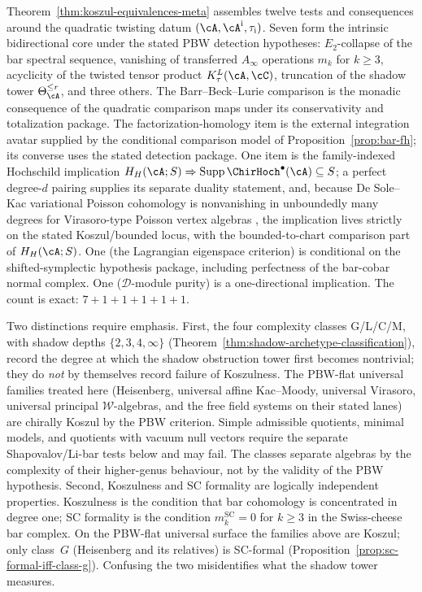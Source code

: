 Theorem~\ref{thm:koszul-equivalences-meta} assembles twelve
tests and consequences around the quadratic twisting datum
$(\cA,\cA^{\mathrm i},\tau_{\mathrm i})$. Seven form the intrinsic
bidirectional core under the stated PBW detection hypotheses:
$E_2$-collapse of the bar spectral sequence, vanishing of
transferred $A_\infty$ operations $m_k$ for $k \geq 3$,
acyclicity of the twisted tensor product
$K_\tau^L(\cA, \cC)$, truncation of the shadow tower
$\Theta_\cA^{\leq r}$, and three others. The
Barr--Beck--Lurie comparison is the monadic consequence of the
quadratic comparison maps under its conservativity and totalization
package. The factorization-homology item is the external integration
avatar supplied by the conditional comparison model of
Proposition~\ref{prop:bar-fh}; its converse uses the stated detection
package. One item is the family-indexed
Hochschild implication
$H_H(\cA;S)\Rightarrow
\operatorname{Supp}\ChirHoch^\bullet(\cA)\subseteq S$; a perfect
degree-$d$ pairing supplies its separate duality statement, and,
because De Sole--Kac variational Poisson cohomology is nonvanishing
in unboundedly many degrees for Virasoro-type Poisson vertex algebras
\cite{BDSK21}, the implication lives strictly on the stated
Koszul/bounded locus, with the bounded-to-chart comparison part of
$H_H(\cA;S)$. One (the Lagrangian eigenspace
criterion) is conditional on the shifted-symplectic hypothesis
package, including perfectness of the bar-cobar normal complex.
One ($\mathcal{D}$-module purity) is a
one-directional implication. The count is exact:
$7 + 1 + 1 + 1 + 1 + 1$.

Two distinctions require emphasis. First, the four complexity
classes G/L/C/M, with shadow depths
$\{2, 3, 4, \infty\}$
(Theorem~\ref{thm:shadow-archetype-classification}), record the
degree at which the shadow obstruction tower first becomes
nontrivial; they do \emph{not} by themselves record failure of
Koszulness. The PBW-flat universal families treated here
\textup{(}Heisenberg, universal affine Kac--Moody, universal
Virasoro, universal principal $\mathcal W$-algebras, and the free
field systems on their stated lanes\textup{)} are chirally Koszul by
the PBW criterion. Simple admissible quotients, minimal models, and
quotients with vacuum null vectors require the separate
Shapovalov/Li-bar tests below and may fail. The classes separate
algebras by the complexity of their higher-genus behaviour, not by
the validity of the PBW hypothesis. Second,
Koszulness and SC formality are logically independent properties.
Koszulness is the condition that bar cohomology is concentrated
in degree one; SC formality is the condition
$m_k^{\mathrm{SC}} = 0$ for $k \geq 3$ in the Swiss-cheese
bar complex. On the PBW-flat universal surface the families above
are Koszul; only class~$G$ (Heisenberg and its relatives) is
SC-formal
(Proposition~\ref{prop:sc-formal-iff-class-g}).
Confusing the two misidentifies what the shadow tower measures.

